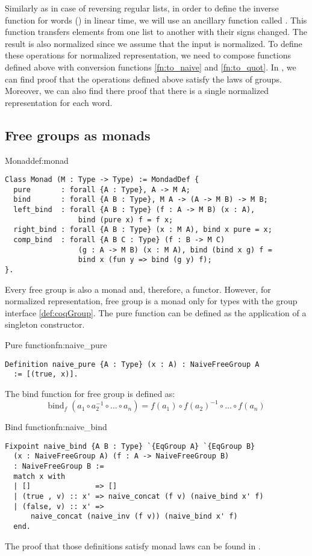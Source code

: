 Similarly as in case of reversing regular lists, in order to define the inverse function for words () in linear time, we will use an ancillary function called . This function transfers elements from one list to another with their signs changed. The result is also normalized since we assume that the input is normalized.
To define these operations for normalized representation, we need to compose functions defined above with conversion functions \ref{fn:to_naive} and \ref{fn:to_quot}. In , we can find proof that the operations defined above satisfy the laws of groups. Moreover, we can also find there proof that there is a single normalized representation for each word.  
\subsection{Free groups as monads}
\begin{defi}{Monad}{def:monad}
\begin{verbatim}
Class Monad (M : Type -> Type) := MondadDef {
  pure       : forall {A : Type}, A -> M A;
  bind       : forall {A B : Type}, M A -> (A -> M B) -> M B;
  left_bind  : forall {A B : Type} (f : A -> M B) (x : A), 
                 bind (pure x) f = f x; 
  right_bind : forall {A B : Type} (x : M A), bind x pure = x; 
  comp_bind  : forall {A B C : Type} (f : B -> M C) 
                 (g : A -> M B) (x : M A), bind (bind x g) f = 
                 bind x (fun y => bind (g y) f);
}.
\end{verbatim}
\end{defi}
Every free group is also a monad and, therefore, a functor. However, for normalized representation, free group is a monad only for types with the group interface \ref{def:coqGroup}. The pure function can be defined as the application of a singleton constructor.
\begin{func}{Pure function}{fn:naive_pure}
\begin{verbatim}
Definition naive_pure {A : Type} (x : A) : NaiveFreeGroup A 
  := [(true, x)].
\end{verbatim}
\end{func}
The bind function for free group is defined as:
$$
    \textrm{bind}_f \; (a_1 \circ a_2^{-1} \circ \dots \circ a_n) = f (a_1) \circ f (a_2) ^{-1} \circ \dots \circ f (a_n)
$$
\pagebreak
\begin{func}{Bind function}{fn:naive_bind}
\begin{verbatim}
Fixpoint naive_bind {A B : Type} `{EqGroup A} `{EqGroup B} 
  (x : NaiveFreeGroup A) (f : A -> NaiveFreeGroup B) 
  : NaiveFreeGroup B :=
  match x with
  | []               => []
  | (true , v) :: x' => naive_concat (f v) (naive_bind x' f)
  | (false, v) :: x' => 
      naive_concat (naive_inv (f v)) (naive_bind x' f)
  end.
\end{verbatim}
\end{func}
The proof that those definitions satisfy monad laws can be found in .
